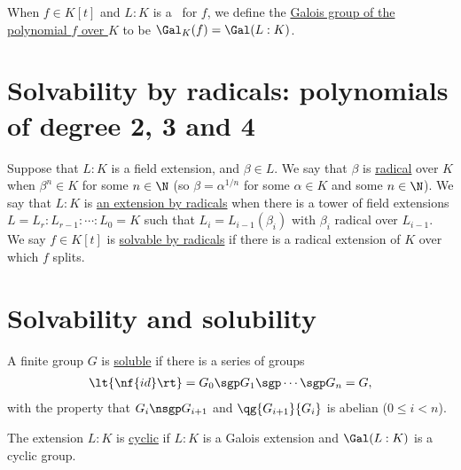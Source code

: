 \documentclass{article}
\begin{document}
  \begin{tdefinition}
    When \( f\in K[t] \) and \( L:K \) is a \sfe~for \( f \), we define the \ul{Galois group of the polynomial \( f \) over \( K \)} to be \( \Gal_K(f) = \Gal(L:K) \).
  \end{tdefinition}

\section{Solvability by radicals: polynomials of degree 2, 3 and 4}
  \begin{tdefinition}
    Suppose that \( L:K \) is a field extension, and \( \beta\in L \).
    We say that \( \beta \) is \ul{radical} over \( K \) when \( \beta^n\in K \) for some \( n\in \N \) (so \( \beta=\alpha^{1/n} \) for some \( \alpha\in K \) and some \( n\in\N \)).
    We say that \( L:K \) is \ul{an extension by radicals} when there is a tower of field extensions \( L=L_r:L_{r-1}:\cdots:L_0=K \) such that \( L_i=L_{i-1}(\beta_i) \) with \( \beta_i \) radical over \( L_{i-1} \).
    We say \( f\in K[t] \) is \ul{solvable by radicals} if there is a radical extension of \( K \) over which \( f \) splits.
  \end{tdefinition}

\section{Solvability and solubility}
  \begin{tdefinition}
    A finite group \( G \) is \ul{soluble} if there is a series of groups \begin{align*}
      \lt\{ \nf{id} \rt\} = G_0 \sgp G_1 \sgp \cdots\sgp G_n = G,
    \end{align*}
    with the property that \( G_i \nsgp G_{i+1} \) and \( \qg{G_{i+1}}{G_i} \) is abelian (\( 0\leq i < n \)).
  \end{tdefinition}

  \begin{tdefinition}
    The extension \( L:K \) is \ul{cyclic} if \( L:K \) is a Galois extension and \( \Gal(L:K) \) is a cyclic group.
  \end{tdefinition}
\end{document}
